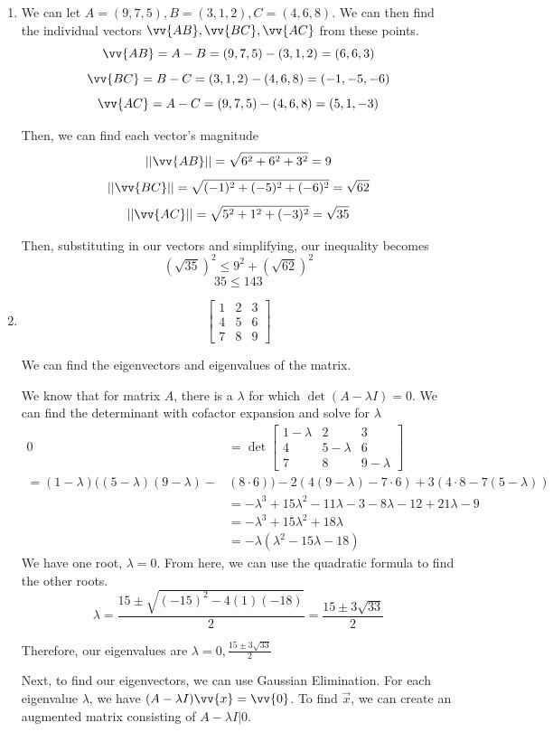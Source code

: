 \documentclass[12pt, letterpaper, twoside]{article}
\begin{document}
\begin{enumerate}
\item 

We can let \(A=(9,7,5), B=(3,1,2), C=(4,6,8)\).
We can then find the individual vectors \(\vv{AB}, \vv{BC}, \vv{AC}\) from these points.
\[\vv{AB}=A-B=(9,7,5)-(3,1,2)=(6,6,3)\]
\[\vv{BC}=B-C=(3,1,2)-(4,6,8)=(-1, -5, -6)\]
\[\vv{AC}=A-C=(9,7,5)-(4,6,8)=(5,1,-3)\]

Then, we can find each vector's magnitude 
\[||\vv{AB}|| = \sqrt{6^2+6^2+3^2}=9\]
\[||\vv{BC}|| = \sqrt{(-1)^2+(-5)^2+(-6)^2}=\sqrt{62}\]
\[||\vv{AC}|| = \sqrt{5^2+1^2+(-3)^2}=\sqrt{35}\]

Then, substituting in our vectors and simplifying, our inequality becomes 
\[(\sqrt{35})^2\leq 9^2+(\sqrt{62})^2\]
\[35\leq143\]

\item 
\[\begin{bmatrix}
    1&2&3\\
    4&5&6\\
    7&8&9
\end{bmatrix}\]

We can find the eigenvectors and eigenvalues of the matrix.

We know that for matrix \(A\), there is a \(\lambda\) for which \(\det (A-\lambda I)=0\).
We can find the determinant with cofactor expansion and solve for \(\lambda\)
\begin{align*}
0&=\det \begin{bmatrix}
    1-\lambda&2&3\\
    4&5-\lambda&6\\
    7&8&9-\lambda
\end{bmatrix}\\
=(1-\lambda)((5-\lambda)(9-\lambda)-&(8\cdot 6))-2(4(9-\lambda)-7\cdot6)+3(4\cdot8-7(5-\lambda))\\
&=-\lambda^3+15\lambda^2-11\lambda-3-8\lambda-12+21\lambda-9\\
&=-\lambda^3+15\lambda^2+18\lambda\\
&=-\lambda(\lambda^2-15\lambda-18)
\end{align*}
We have one root, \(\lambda=0\). 
From here, we can use the quadratic formula to find the other roots.
\[\lambda=\frac{15\pm\sqrt{(-15)^2-4(1)(-18)}}{2}=\frac{15\pm3\sqrt{33}}{2}\]

Therefore, our eigenvalues are \(\lambda=0, \frac{15\pm3\sqrt{33}}{2}\)

Next, to find our eigenvectors, we can use Gaussian Elimination. 
For each eigenvalue \(\lambda\), we have \((A-\lambda I)\vv{x}=\vv{0}\).
To find \(\vec x\), we can create an augmented matrix consisting of \(A-\lambda I | 0\).


\end{enumerate}
\end{document}
